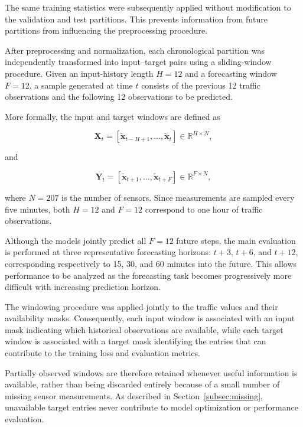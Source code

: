 The same training statistics were subsequently applied without modification
to the validation and test partitions. This prevents information from future
partitions from influencing the preprocessing procedure.

After preprocessing and normalization, each chronological partition was
independently transformed into input--target pairs using a sliding-window
procedure. Given an input-history length $H=12$ and a forecasting window
$F=12$, a sample generated at time $t$ consists of the previous 12 traffic
observations and the following 12 observations to be predicted.

More formally, the input and target windows are defined as

\begin{equation}
    \mathbf{X}_t
    =
    \left[
        \tilde{\mathbf{x}}_{t-H+1},
        \ldots,
        \tilde{\mathbf{x}}_{t}
    \right]
    \in \mathbb{R}^{H \times N},
    \label{eq:input_window}
\end{equation}

and

\begin{equation}
    \mathbf{Y}_t
    =
    \left[
        \tilde{\mathbf{x}}_{t+1},
        \ldots,
        \tilde{\mathbf{x}}_{t+F}
    \right]
    \in \mathbb{R}^{F \times N},
    \label{eq:target_window}
\end{equation}

where $N=207$ is the number of sensors. Since measurements are sampled every
five minutes, both $H=12$ and $F=12$ correspond to one hour of traffic
observations.


Although the models jointly predict all $F=12$ future steps, the main
evaluation is performed at three representative forecasting horizons:
$t+3$, $t+6$, and $t+12$, corresponding respectively to 15, 30, and
60 minutes into the future. This allows performance to be analyzed as the
forecasting task becomes progressively more difficult with increasing
prediction horizon.


The windowing procedure was applied jointly to the traffic values and their
availability masks. Consequently, each input window is associated with an
input mask indicating which historical observations are available, while
each target window is associated with a target mask identifying the entries
that can contribute to the training loss and evaluation metrics.

Partially observed windows are therefore retained whenever useful information
is available, rather than being discarded entirely because of a small number
of missing sensor measurements. As described in
Section~\ref{subsec:missing}, unavailable target entries never contribute to
model optimization or performance evaluation.


